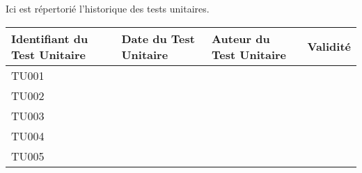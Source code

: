 
Ici est répertorié l'historique des tests unitaires. \\

\begin{table}[H]
\centering
	\begin{tabularx}{17.4cm}{|X|X|X|X|}
	\hline
	\rowcolor{gray!40} Identifiant du Test Unitaire & Date du Test Unitaire & Auteur du Test Unitaire & Validité\\
	\hline
	 TU001 & & & \\
	\hline
	 TU002 & & & \\
	 \hline
	 TU003 & & & \\
	 \hline
	 TU004 & & & \\
	 \hline 
	 TU005 & & & \\
	 \hline
	\end{tabularx}
\end{table}


